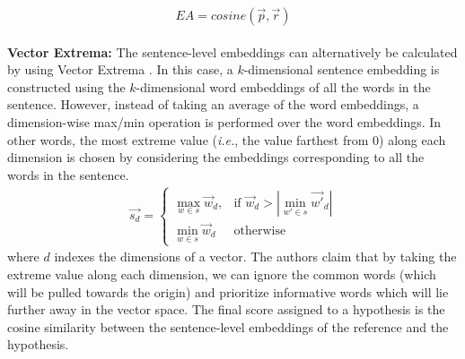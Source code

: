 $$ EA = cosine(\overrightarrow{p},\overrightarrow{r})$$
\\
\textbf{Vector Extrema:} The sentence-level embeddings can alternatively be calculated by using Vector Extrema . In this case, a $k$-dimensional sentence embedding is constructed using the $k$-dimensional word embeddings of all the words in the sentence. However, instead of taking an average of the word embeddings, a dimension-wise max/min operation is performed over the word embeddings. In other words, the most extreme value (\textit{i.e.}, the value farthest from $0$) along each dimension is chosen by considering the embeddings corresponding to all the words in the sentence. 
\begin{align*}
    \overrightarrow{s_d} = 
    \begin{cases}
     \max_{w \in s}\overrightarrow{w}_d, & \text{if } \overrightarrow{w}_d>|\min_{w'\in s}\overrightarrow{w'}_d| \\
     \min_{w\in s}\overrightarrow{w}_d & \text{otherwise}
    \end{cases}
\end{align*}
where $d$ indexes the dimensions of a vector. 
The authors claim that by taking the extreme value along each dimension, we can ignore the common words (which will be pulled towards the origin) and prioritize informative words which will lie further away  in the vector space.  The final score assigned to a hypothesis is the cosine similarity between the sentence-level embeddings of the reference and the hypothesis.\\
\\
